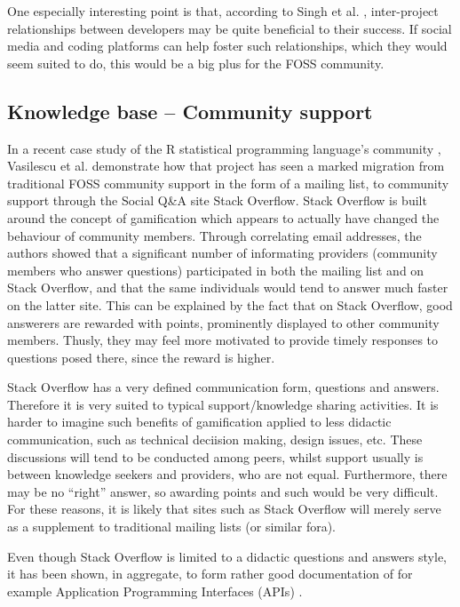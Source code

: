 \documentclass[a4paper,11pt]{article} %
\begin{document}
One especially interesting point is that, according to Singh et
al. \cite{singh2011network}, inter-project relationships between developers
may be quite beneficial to their success. If social media and coding
platforms can help foster such relationships, which they would seem suited
to do, this would be a big plus for the FOSS community.

\subsection{Knowledge base -- Community support}

In a recent case study of the R statistical programming language's community
\cite{Vasilescu14StackOverflow}, Vasilescu et al. demonstrate how that
project has seen a marked migration from traditional FOSS community support
in the form of a mailing list, to community support through the Social
Q\&{}A site Stack Overflow. Stack Overflow is built around the concept of
gamification\cite{deterding2011game} which appears to actually have changed
the behaviour of community members. Through correlating email addresses, the
authors showed that a significant number of informating providers (community
members who answer questions) participated in both the mailing list and on
Stack Overflow, and that the same individuals would tend to answer much
faster on the latter site. This can be explained by the fact that on
Stack Overflow, good answerers are rewarded with points, prominently
displayed to other community members. Thusly, they may feel more motivated
to provide timely responses to questions posed there, since the reward is
higher.

Stack Overflow has a very defined communication form, questions and
answers. Therefore it is very suited to typical support/knowledge sharing
activities. It is harder to imagine such benefits of gamification applied to
less didactic communication, such as technical deciision making, design
issues, etc. These discussions will tend to be conducted among peers, whilst
support usually is between knowledge seekers and providers, who are not
equal. Furthermore, there may be no ``right'' answer, so awarding points and
such would be very difficult. For these reasons, it is likely that sites
such as Stack Overflow will merely serve as a supplement to traditional
mailing lists (or similar fora).

Even though Stack Overflow is limited to a didactic questions and answers
style, it has been shown, in aggregate, to form rather good documentation of
for example Application Programming Interfaces (APIs)
\cite{parnin2012crowd}.
\end{document}
